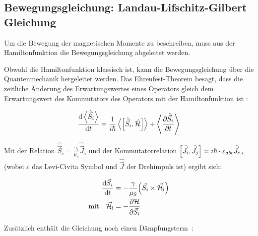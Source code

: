 \documentclass[main.tex]{subfiles}
\begin{document}
\subsection{Bewegungsgleichung: Landau-Lifschitz-Gilbert Gleichung}
Um die Bewegung der magnetischen Momente zu beschreiben, muss aus der Hamiltonfunktion die Bewegungsgleichung abgeleitet werden.

Obwohl die Hamiltonfunktion klassisch ist, kann die Bewegungsgleichung über die Quantenmechanik hergeleitet werden. 
Das Ehrenfest-Theorem besagt, dass die zeitliche Änderung des Erwartungswertes eines Operators gleich dem Erwartungswert des Kommutators des Operators mit der Hamiltonfunktion ist \cite{qm-1-Schwabl}:

\begin{align}
	\dv{\expval{\hat{\vec{S}}_i}}{t} = \frac{1}{i\hbar}
	\expval{\qty[\hat{\vec{S}}_i,
			\hat{\mathcal{H}}]} + \expval{\pdv{\hat{\vec{S}}_i}{t}}
\end{align}


Mit der Relation 
\(\hat{\vec{S}}_i = \frac{\gamma_i}{\mu_{\text{S}}}\hat{\vec{J}}_i\) 
und der Kommutatorrelation 
\(\qty[\hat{\vec{J}}_i, \hat{\vec{J}}_j] = i \hbar \cdot \varepsilon_{abc} \hat{\vec{J}}_{c,i}\) 
(wobei \(\varepsilon\) das Levi-Civita Symbol und \(\hat{\vec{J}}\) der Drehimpuls ist) ergibt sich:

\begin{align}
	\dv{\vec{S}_i}{t}
	& = -\frac{\gamma}{\mu_{\text{S}}}
	\qty(\vec{S}_i \times \vec{\mathcal{H}}_{\text{i}})\\
	\text{mit} \quad \vec{\mathcal{H}}_{\text{i}} 
	& = - \pdv{\mathcal{H}}{\vec{S}_i}
\end{align}


Zusätzlich enthält die Gleichung noch einen Dämpfungsterm~\cite{Gilbert-damping}:
\end{document}
